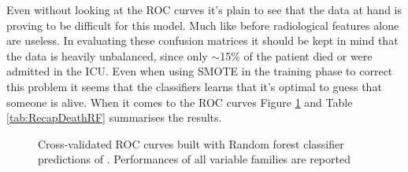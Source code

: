 Even without looking at the ROC curves it's plain to see that the data at hand is proving to be difficult for this model. Much like before radiological features alone are useless.
In evaluating these confusion matrices it should be kept in mind that the data is heavily unbalanced, since only $\sim$15\% of the patient died or were admitted in the ICU.
Even when using SMOTE in the training phase to correct this problem it seems that the classifiers learns that it's optimal to guess that someone is alive. When it comes to the ROC curves Figure \ref{fig:RFDeathROC} and Table \ref{tab:RecapDeathRF} summarises the results.

\begin{figure}[H]
\centering
	\newline
        \caption{Cross-validated ROC curves built with Random forest classifier predictions of \death. Performances of all variable families are reported }\label{fig:RFDeathROC}
\end{figure}


